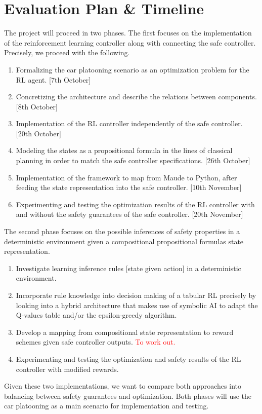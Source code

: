\documentclass[a4paper,11pt]{article}
\begin{document}
\section{Evaluation Plan & Timeline}
The project will proceed in two phases. The first focuses on the implementation of the reinforcement learning controller along with 
connecting the safe controller. Precisely, we proceed with the following. 
\begin{enumerate}
  \item Formalizing the car platooning scenario as an optimization problem for the RL agent. [7th October] 
  \item Concretizing the architecture and describe the relations between components. [8th October]
  \item Implementation of the RL controller independently of the safe controller. [20th October]
  \item Modeling the states as a propositional formula in the lines of classical planning in order to match the safe controller specifications. [26th October]
  \item Implementation of the framework to map from Maude to Python, after feeding the state representation into the safe controller. [10th November]
  \item Experimenting and testing the optimization results of the RL controller with and without the safety guarantees of the safe controller. [20th November]
\end{enumerate}

The second phase focuses on the possible inferences of safety properties in a deterministic environment given a compositional propositional formulas
state representation. 
\begin{enumerate}
  \item Investigate learning inference rules [state given action] in a deterministic environment. 
  \item Incorporate rule knowledge into decision making of a tabular RL precisely by looking into a hybrid architecture that makes use of 
        symbolic AI to adapt the Q-values table and/or the epsilon-greedy algorithm. 
  \item Develop a mapping from compositional state representation to reward schemes given safe controller outputs. \textcolor{red}{To work out.}
  \item Experimenting and testing the optimization and safety results of the RL controller with modified rewards. 
\end{enumerate}

Given these two implementations, we want to compare both approaches into balancing between safety guarantees and optimization. 
Both phases will use the car platooning as a main scenario for implementation and testing. 




\end{document}

